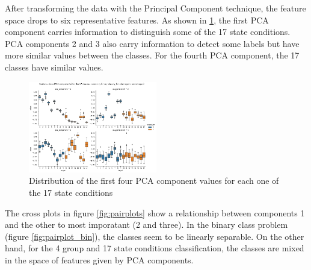 \documentclass[twocolumn]{article}
\begin{document}
After transforming the data with the Principal Component technique, the feature space drops to six representative features. As shown in \ref*{fig:exploratory_01}, the first PCA component carries information to distinguish some of the 17 state conditions. PCA components 2 and 3 also carry information to detect some labels but have more similar values between the classes. For the fourth PCA component, the 17 classes have similar values.

\begin{figure}[H]
      \centering
      \includegraphics[width=0.5\textwidth]{exploratory_01.png}
      \caption{Distribution of the first four PCA component values for each one of the 17 state conditions}
      \label{fig:exploratory_01}
\end{figure}

The cross plots in figure \ref*{fig:pairplots} show a relationship between components 1 and the other to most imporatant (2 and three). In the binary class problem (figure \ref*{fig:pairplot_bin}), the classes seem to be linearly separable. On the other hand, for the 4 group and 17 state conditions classification, the classes are mixed in the space of features given by PCA components.
\end{document}
